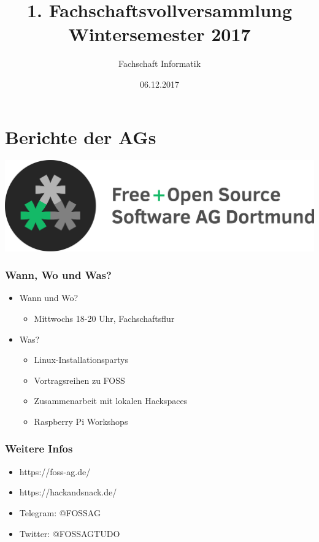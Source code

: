 \documentclass[xcolor=table]{beamer}
\title{1. Fachschaftsvollversammlung Wintersemester 2017}
\author{Fachschaft Informatik}
\date{06.12.2017}
\newcommand{\titleslide}[1]{
	\begin{frame}
		\huge #1 \normalfont
	\end{frame}
}
\begin{document}
\tudotitle

\section{Berichte der AGs}

\titleslide{\centering\includegraphics[scale=0.2]{res/logo_text-voll-transp.png}}

\begin{frame}
	\frametitle{Wann, Wo und Was?}
	\begin{itemize}
		\item Wann und Wo?
			\begin{itemize}
				\item Mittwochs 18-20 Uhr, Fachschaftsflur
			\end{itemize}
		\item Was?
		\begin{itemize}
			\item Linux-Installationspartys
			\item Vortragsreihen zu FOSS
			\item Zusammenarbeit mit lokalen Hackspaces
			\item Raspberry Pi Workshops
		\end{itemize}
	\end{itemize}
\end{frame}

\begin{frame}
	\frametitle{Weitere Infos}
	\begin{itemize}
		\item https://foss-ag.de/
		\item https://hackandsnack.de/
		\item Telegram: @FOSSAG
		\item Twitter: @FOSSAGTUDO
	\end{itemize}
\end{frame}
\end{document}
